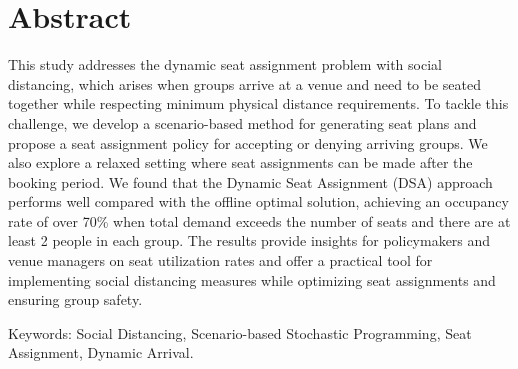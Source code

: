 
\section*{Abstract}

This study addresses the dynamic seat assignment problem with social distancing, which arises when groups arrive at a venue and need to be seated together while respecting minimum physical distance requirements. To tackle this challenge, we develop a scenario-based method for generating seat plans and propose a seat assignment policy for accepting or denying arriving groups. We also explore a relaxed setting where seat assignments can be made after the booking period. We found that the Dynamic Seat Assignment (DSA) approach performs well compared with the offline optimal solution, achieving an occupancy rate of over 70\% when total demand exceeds the number of seats and there are at least 2 people in each group. The results provide insights for policymakers and venue managers on seat utilization rates and offer a practical tool for implementing social distancing measures while optimizing seat assignments and ensuring group safety.


Keywords: Social Distancing, Scenario-based Stochastic Programming, Seat Assignment, Dynamic Arrival.


